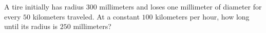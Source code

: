 A tire initially has radius $300$ millimeters and loses one millimeter of diameter for every $50$ kilometers traveled. At a constant $100$ kilometers per hour, how long until its radius is $250$ millimeters?
